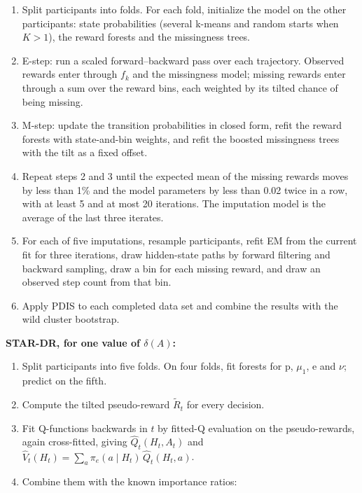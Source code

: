 \documentclass[12pt]{article}
\begin{document}
\begin{enumerate}

\item Split participants into folds. For each fold, initialize the model on the other participants: state probabilities (several k-means and random starts when $K>1$), the reward forests and the missingness trees.

\item E-step: run a scaled forward--backward pass over each trajectory. Observed rewards enter through $f_{k}$ and the missingness model; missing rewards enter through a sum over the reward bins, each weighted by its tilted chance of being missing.

\item M-step: update the transition probabilities in closed form, refit the reward forests with state-and-bin weights, and refit the boosted missingness trees with the tilt as a fixed offset.

\item Repeat steps 2 and 3 until the expected mean of the missing rewards moves by less than 1\% and the model parameters by less than 0.02 twice in a row, with at least 5 and at most 20 iterations. The imputation model is the average of the last three iterates.

\item For each of five imputations, resample participants, refit EM from the current fit for three iterations, draw hidden-state paths by forward filtering and backward sampling, draw a bin for each missing reward, and draw an observed step count from that bin.

\item Apply PDIS to each completed data set and combine the results with the wild cluster bootstrap.

\end{enumerate}

\textbf{STAR-DR, for one value of $\delta(A)$:}

\begin{enumerate}

\item Split participants into five folds. On four folds, fit forests for p, $\mu_1$, e and $\nu$; predict on the fifth.

\item Compute the tilted pseudo-reward $\tilde R_t$ for every decision.

\item Fit Q-functions backwards in $t$ by fitted-Q evaluation on the pseudo-rewards, again cross-fitted, giving $\hat Q_t(H_t,A_t)$ and $\hat V_t(H_t)=\sum_a \pi_e(a\mid H_t)\,\hat Q_t(H_t,a)$.

\item Combine them with the known importance ratios:

\end{enumerate}
\end{document}
